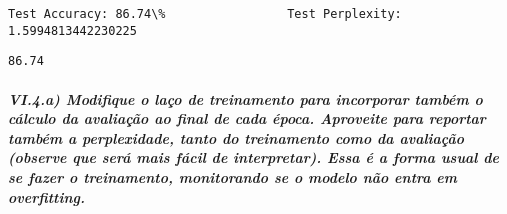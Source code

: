 \documentclass[11pt]{article}
\makeatletter
\newcommand{\boxspacing}{\kern\kvtcb@left@rule\kern\kvtcb@boxsep}
\newcommand{\prompt}[4]{
        {\ttfamily\llap{{\color{#2}[#3]:\hspace{3pt}#4}}\vspace{-\baselineskip}}
    }
\makeatother
\begin{document}
    \begin{Verbatim}[commandchars=\\\{\}]
Test Accuracy: 86.74\%                 Test Perplexity: 1.5994813442230225
    \end{Verbatim}

            \begin{tcolorbox}[breakable, size=fbox, boxrule=.5pt, pad at break*=1mm, opacityfill=0]
\prompt{Out}{outcolor}{37}{\boxspacing}
\begin{Verbatim}[commandchars=\\\{\}]
86.74
\end{Verbatim}
\end{tcolorbox}
        
    \subparagraph{VI.4.a) Modifique o laço de treinamento para incorporar
também o cálculo da avaliação ao final de cada época. Aproveite para
reportar também a perplexidade, tanto do treinamento como da avaliação
(observe que será mais fácil de interpretar). Essa é a forma usual de se
fazer o treinamento, monitorando se o modelo não entra em
overfitting.}\label{vi.4.a-modifique-o-lauxe7o-de-treinamento-para-incorporar-tambuxe9m-o-cuxe1lculo-da-avaliauxe7uxe3o-ao-final-de-cada-uxe9poca.-aproveite-para-reportar-tambuxe9m-a-perplexidade-tanto-do-treinamento-como-da-avaliauxe7uxe3o-observe-que-seruxe1-mais-fuxe1cil-de-interpretar.-essa-uxe9-a-forma-usual-de-se-fazer-o-treinamento-monitorando-se-o-modelo-nuxe3o-entra-em-overfitting.}\mbox{} \\
\end{document}
